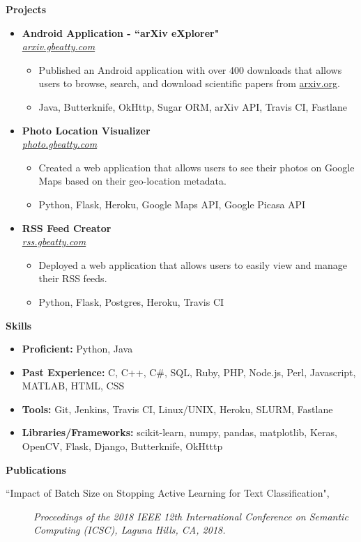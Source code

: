 \documentclass[letterpaper,10pt]{article}
\newcommand{\resitem}[1]{\item #1 \vspace{-2pt}}
\newcommand{\resheading}[1]{{\large \colorbox{mygrey}{\begin{minipage}{\textwidth}{\textbf{#1 \vphantom{p\^{E}}}}\end{minipage}}}}
\newcommand{\ressubheading}[4]{%
  \item\textbf{#1} \hfill #2\null\\
  \textit{#3} \hfill \textit{#4}%
  \vspace{-5pt}
}%
\begin{document}
\resheading{Projects}
\begin{itemize}

\ressubheading{Android Application - ``arXiv eXplorer"}{}{\href{http://arxiv.gbeatty.com}{arxiv.gbeatty.com}}{}
	\begin{itemize}
		\resitem{Published an Android application with over 400 downloads that allows users to browse, search, and download scientific papers from \href{http://arxiv.org}{arxiv.org}.}
		\resitem{Java, Butterknife, OkHttp, Sugar ORM, arXiv API, Travis CI, Fastlane}
	\end{itemize}
	

\ressubheading{Photo Location Visualizer}{}{\href{http://photo.gbeatty.com}{photo.gbeatty.com}}{}
	\begin{itemize}
		\resitem{Created a web application that allows users to see their photos on Google Maps based on their geo-location metadata.}
		\resitem{Python, Flask, Heroku, Google Maps API, Google Picasa API}
	\end{itemize}


\ressubheading{RSS Feed Creator}{}{\href{http://rss.gbeatty.com/}{rss.gbeatty.com}}{}
	\begin{itemize}
		\resitem{Deployed a web application that allows users to easily view and manage their RSS feeds.}
		\resitem{Python, Flask, Postgres, Heroku, Travis CI}
	\end{itemize}

\end{itemize}

\resheading{Skills}
	\begin{itemize}
	\resitem{\textbf{Proficient:} Python, Java}
	\resitem{\textbf{Past Experience:} C, C++, C\#, SQL, Ruby, PHP, Node.js, Perl, Javascript, MATLAB, HTML, CSS}
	\resitem{\textbf{Tools:} Git, Jenkins, Travis CI, Linux/UNIX, Heroku, SLURM, Fastlane}
	\resitem{\textbf{Libraries/Frameworks:} scikit-learn, numpy, pandas, matplotlib, Keras, OpenCV, Flask, Django, Butterknife, OkHtttp}
	\end{itemize}

\resheading{Publications}
\begin{description}
\item[``Impact of Batch Size on Stopping Active Learning for Text Classification",]
\emph{Proceedings of the 2018 IEEE 12th International Conference on Semantic Computing (ICSC), Laguna Hills, CA, 2018.}
\end{description}
\end{document}
